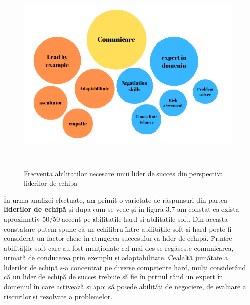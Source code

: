 \documentclass[a4paper, 12pt]{article}
\begin{document}
\begin{enumerate}[A)]
\begin{figure}[!htb]
			\centering
			\includegraphics[width=15cm, height=10cm]{"figures/team leaders succes.png"}
			\caption {Frecvența abilitatilor necesare unui lider de succes din perspectiva liderilor de echipa}\label{fig:four}
	
		\end{figure}

\newpage

	\quad În urma analizei efectuate, am primit o varietate de răspunsuri din partea \textbf{liderilor de echipă} și dupa cum se vede și în figura 3.7 am constat ca exista aproximativ 50/50 accent pe abilitatile hard si abilitatile soft. Din aceasta constatare putem spune că un echilibru între abilitățile soft și hard poate fi considerat un factor cheie în atingerea succesului ca lider de echipă. Printre abilitățile soft care au fost menționate cel mai des se regăsește comunicarea, urmată de conducerea prin exemplu și adaptabilitate. Cealaltă jumătate a liderilor de echipă s-a concentrat pe diverse competențe hard, mulți considerând că un lider de echipă de succes trebuie să fie în primul rând un expert în domeniul în care activează si apoi să posede abilități de negociere, de evaluare a riscurilor și rezolvare a problemelor.


\end{enumerate}
\end{document}
